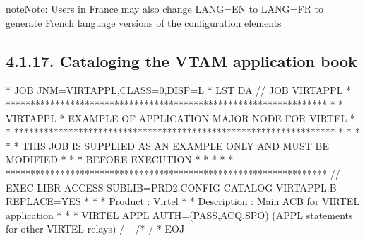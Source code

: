 \documentclass[letterpaper,10pt,english]{sphinxmanual}
\begin{document}
\begin{sphinxadmonition}{note}{Note:}
Users in France may also change LANG=EN to LANG=FR to generate French language versions of the configuration elements
\end{sphinxadmonition}


\subsection{4.1.17. Cataloging the VTAM application book}
\label{\detokenize{Installation_Guide:cataloging-the-vtam-application-book}}
\begin{sphinxVerbatim}[commandchars=\\\{\}]
* \PYGZdl{}\PYGZdl{} JOB JNM=VIRTAPPL,CLASS=0,DISP=L
* \PYGZdl{}\PYGZdl{} LST DA
// JOB VIRTAPPL
* *****************************************************************
* * VIRTAPPL * EXAMPLE OF APPLICATION MAJOR NODE FOR VIRTEL *
* *****************************************************************
* * *
* * THIS JOB IS SUPPLIED AS AN EXAMPLE ONLY AND MUST BE MODIFIED *
* * BEFORE EXECUTION *
* * *
* *****************************************************************
// EXEC LIBR
ACCESS SUBLIB=PRD2.CONFIG
CATALOG VIRTAPPL.B REPLACE=YES
* \PYGZhy{}\PYGZhy{}\PYGZhy{}\PYGZhy{}\PYGZhy{}\PYGZhy{}\PYGZhy{}\PYGZhy{}\PYGZhy{}\PYGZhy{}\PYGZhy{}\PYGZhy{}\PYGZhy{}\PYGZhy{}\PYGZhy{}\PYGZhy{}\PYGZhy{}\PYGZhy{}\PYGZhy{}\PYGZhy{}\PYGZhy{}\PYGZhy{}\PYGZhy{}\PYGZhy{}\PYGZhy{}\PYGZhy{}\PYGZhy{}\PYGZhy{}\PYGZhy{}\PYGZhy{}\PYGZhy{}\PYGZhy{}\PYGZhy{}\PYGZhy{}\PYGZhy{}\PYGZhy{}\PYGZhy{}\PYGZhy{}\PYGZhy{}\PYGZhy{}\PYGZhy{}\PYGZhy{}\PYGZhy{}\PYGZhy{}\PYGZhy{}\PYGZhy{}\PYGZhy{}\PYGZhy{}\PYGZhy{}\PYGZhy{}\PYGZhy{}\PYGZhy{}\PYGZhy{}\PYGZhy{}\PYGZhy{}\PYGZhy{}\PYGZhy{}\PYGZhy{}\PYGZhy{}\PYGZhy{}\PYGZhy{}\PYGZhy{}\PYGZhy{}\PYGZhy{}\PYGZhy{}\PYGZhy{} *
* Product : Virtel *
* Description : Main ACB for VIRTEL application *
* \PYGZhy{}\PYGZhy{}\PYGZhy{}\PYGZhy{}\PYGZhy{}\PYGZhy{}\PYGZhy{}\PYGZhy{}\PYGZhy{}\PYGZhy{}\PYGZhy{}\PYGZhy{}\PYGZhy{}\PYGZhy{}\PYGZhy{}\PYGZhy{}\PYGZhy{}\PYGZhy{}\PYGZhy{}\PYGZhy{}\PYGZhy{}\PYGZhy{}\PYGZhy{}\PYGZhy{}\PYGZhy{}\PYGZhy{}\PYGZhy{}\PYGZhy{}\PYGZhy{}\PYGZhy{}\PYGZhy{}\PYGZhy{}\PYGZhy{}\PYGZhy{}\PYGZhy{}\PYGZhy{}\PYGZhy{}\PYGZhy{}\PYGZhy{}\PYGZhy{}\PYGZhy{}\PYGZhy{}\PYGZhy{}\PYGZhy{}\PYGZhy{}\PYGZhy{}\PYGZhy{}\PYGZhy{}\PYGZhy{}\PYGZhy{}\PYGZhy{}\PYGZhy{}\PYGZhy{}\PYGZhy{}\PYGZhy{}\PYGZhy{}\PYGZhy{}\PYGZhy{}\PYGZhy{}\PYGZhy{}\PYGZhy{}\PYGZhy{}\PYGZhy{}\PYGZhy{}\PYGZhy{}\PYGZhy{} *
VIRTEL APPL AUTH=(PASS,ACQ,SPO)
  (APPL statements for other VIRTEL relays)
/+
/*
/\PYGZam{}
* \PYGZdl{}\PYGZdl{} EOJ
\end{sphinxVerbatim}
\end{document}
